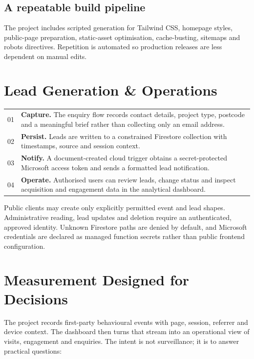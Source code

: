 \documentclass[10.5pt,a4paper]{article}
\newcommand{\eyebrow}[1]{%
  {\fontsize{7.8}{10}\selectfont\bfseries\color{MarkouStone}\textls[180]{\MakeUppercase{#1}}}%
}
\begin{document}
\subsection{A repeatable build pipeline}
The project includes scripted generation for Tailwind CSS, homepage styles,
public-page preparation, static-asset optimisation, cache-busting, sitemaps and
robots directives. Repetition is automated so production releases are less
dependent on manual edits.

\section{Lead Generation \& Operations}
\begin{tabularx}{\textwidth}{>{\color{MarkouStone}\DisplayFont\Large}p{15mm} X}
01 & \textbf{Capture.} The enquiry flow records contact details, project type,
postcode and a meaningful brief rather than collecting only an email address.\\
02 & \textbf{Persist.} Leads are written to a constrained Firestore collection
with timestamps, source and session context.\\
03 & \textbf{Notify.} A document-created cloud trigger obtains a
secret-protected Microsoft access token and sends a formatted lead notification.\\
04 & \textbf{Operate.} Authorised users can review leads, change status and
inspect acquisition and engagement data in the analytical dashboard.\\
\end{tabularx}

\vspace{5mm}
\begin{insightbox}
\eyebrow{Security boundary}\par\vspace{2mm}
\small
Public clients may create only explicitly permitted event and lead shapes.
Administrative reading, lead updates and deletion require an authenticated,
approved identity. Unknown Firestore paths are denied by default, and Microsoft
credentials are declared as managed function secrets rather than public
frontend configuration.
\end{insightbox}

\section{Measurement Designed for Decisions}
The project records first-party behavioural events with page, session, referrer
and device context. The dashboard then turns that stream into an operational
view of visits, engagement and enquiries. The intent is not surveillance; it is
to answer practical questions:
\end{document}

